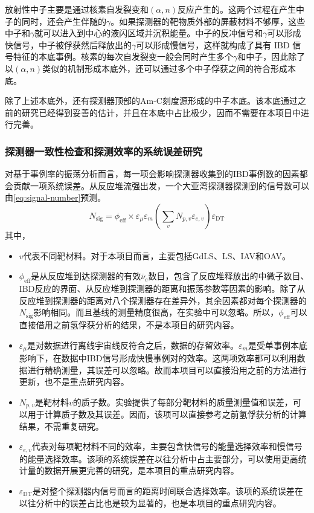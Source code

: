 \documentclass[a4paper,zihao=-4]{article}
\begin{document}
放射性中子主要是通过核素自发裂变和$(\alpha,n)$反应产生的。这两个过程在产生中子的同时，还会产生伴随的$\gamma$。如果探测器的靶物质外部的屏蔽材料不够厚，这些中子和$\gamma$就可以进入到中心的液闪区域并沉积能量。中子的反冲信号和$\gamma$可以形成快信号，中子被俘获然后释放出的$\gamma$可以形成慢信号，这样就构成了具有 IBD 信号特征的本底事例。核素的每次自发裂变一般会同时产生多个$\gamma$和中子，因此除了以$(\alpha,n)$类似的机制形成本底外，还可以通过多个中子俘获之间的符合形成本底。

除了上述本底外，还有探测器顶部的Am-C刻度源形成的中子本底。该本底通过之前的研究已经得到妥善的估计，并且在本底中占比极少，因而不需要在本项目中进行完善。

\subsubsection{探测器一致性检查和探测效率的系统误差研究}\label{sec:uncertainty}
对基于事例率的振荡分析而言，每一项会影响探测器收集到的IBD事例数的因素都会贡献一项系统误差。从反应堆流强出发，一个大亚湾探测器探测到的信号数可以由\cref{eq:signal-number}预测。
\begin{equation}\label{eq:signal-number}
	N_{\text{sig}} = \phi_{\text{eff}} \times \varepsilon_\mu\varepsilon_m\left(\sum_{v}N_{p,v}\varepsilon_{e,v}\right)\varepsilon_{\text{DT}}
\end{equation}
其中，
\begin{itemize}
	\item $v$代表不同靶材料。对于本项目而言，主要包括GdLS、LS、IAV和OAV。
	\item $\phi_{\text{eff}}$是从反应堆到达探测器的有效$\overline{\nu}_e$数目，包含了反应堆释放出的中微子数目、IBD反应的界面、从反应堆到探测器的距离和振荡参数等因素的影响。除了从反应堆到探测器的距离对八个探测器存在差异外，其余因素都对每个探测器的$N_{\text{sig}}$影响相同。而且基线的测量精度很高，在实验中可以忽略。所以，$\phi_{\text{eff}}$可以直接借用之前氢俘获分析的结果，不是本项目的研究内容。
	\item $\varepsilon_\mu$是对数据进行离线宇宙线反符合之后，数据的存留效率。$\varepsilon_m$是受单事例本底影响下，在数据中IBD信号形成快慢事例对的效率。这两项效率都可以利用数据进行精确测量，其误差可以忽略。故而本项目可以直接沿用之前的方法进行更新，也不是重点研究内容。
	\item $N_{p,v}$是靶材料$v$的质子数。实验提供了每部分靶材料的质量测量值和误差，可以用于计算质子数及其误差。因而，该项可以直接参考之前氢俘获分析的计算结果，不需重复研究。
	\item $\varepsilon_{e,v}$代表对每项靶材料不同的效率，主要包含快信号的能量选择效率和慢信号的能量选择效率。该项的系统误差在以往分析中占主要部分，可以使用更高统计量的数据开展更完善的研究，是本项目的重点研究内容。
	\item $\varepsilon_{\text{DT}}$是对整个探测器内信号而言的距离时间联合选择效率。该项的系统误差在以往分析中的误差占比也是较为显著的，也是本项目的重点研究内容。
\end{itemize}
\end{document}
